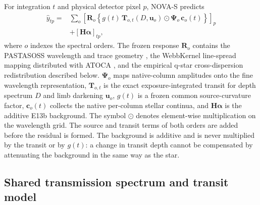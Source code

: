 For integration $t$ and physical detector pixel $p$, NOVA-S predicts
\begin{equation}
\begin{split}
 \widehat y_{tp}
 = {}& \sum_o \left[\bm{R}_o\left\{
   g(t)\,\bm{T}_{o,t}(D,\bm{u}_o)\odot
   \bm{\Psi}_o\,\bm{c}_o(t)\right\}\right]_p \\
 & + \left[\bm{H}\bm{\alpha}\right]_{tp} ,
\end{split}
 \label{eq:nova-forward}
\end{equation}
where $o$ indexes the spectral orders. The frozen response $\bm{R}_o$
contains the PASTASOSS wavelength and trace geometry
\citep{BainesEtAl2023Trace,BainesEtAl2023Wavelength}, the WebbKernel
line-spread mapping distributed with ATOCA \citep{DarveauBernierEtAl2022},
and the empirical q-star cross-dispersion redistribution described below.
$\bm{\Psi}_o$ maps native-column amplitudes onto the fine wavelength
representation, $\bm{T}_{o,t}$ is the exact exposure-integrated transit for
depth spectrum $D$ and limb darkening $\bm{u}_o$, $g(t)$ is a frozen common
source-curvature factor, $\bm{c}_o(t)$ collects the native per-column
stellar continua, and $\bm{H}\bm{\alpha}$ is the additive E13b background.
The symbol $\odot$ denotes element-wise multiplication on the wavelength
grid. The source and transit terms of both orders are added before the
residual is formed. The background is additive and is never multiplied by
the transit or by $g(t)$: a change in transit depth cannot be compensated by
attenuating the background in the same way as the star.

\subsection{Shared transmission spectrum and transit model}


